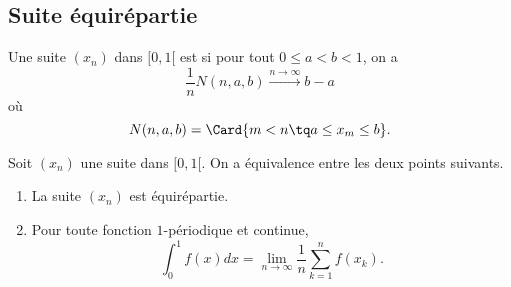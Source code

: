 \subsection{Suite équirépartie}

\begin{definition}
    Une suite \( (x_n)\) dans \( \mathopen[ 0 , 1 [\) est  si pour tout \( 0\leq a<b<1\), on a
    \begin{equation}
        \frac{1}{ n }N(n,a,b)\stackrel{n\to\infty}{\longrightarrow}b-a
    \end{equation}
    où
    \begin{equation}
        N(n,a,b)=\Card\{ m<n\tq a\leq x_m\leq b \}.
    \end{equation}
\end{definition}

\begin{proposition}  \label{PropDMvPDc}
    Soit \( (x_n)\) une suite dans \( \mathopen[ 0 , 1 [\). On a équivalence entre les deux points suivants.
    \begin{enumerate}
        \item
            La suite \( (x_n)\) est équirépartie.
        \item
            Pour toute fonction \( 1\)-périodique et continue,
            \begin{equation}
                \int_0^1f(x)dx=\lim_{n\to \infty} \frac{1}{ n }\sum_{k=1}^nf(x_k).
            \end{equation}
    \end{enumerate}
\end{proposition}

